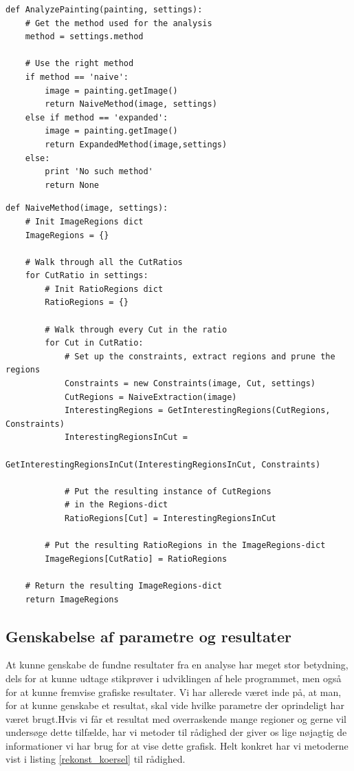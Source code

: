 {\begin{lstlisting}[caption={Pseudokode til analyse af malerier efter
    metode}, captionpos=b, label={pseudo_naiveMethod}, frame=tb,
    breaklines=false, float=h]
def AnalyzePainting(painting, settings):
    # Get the method used for the analysis
    method = settings.method

    # Use the right method
    if method == 'naive':
        image = painting.getImage()
        return NaiveMethod(image, settings)
    else if method == 'expanded':
		image = painting.getImage()
		return ExpandedMethod(image,settings)
	else:
        print 'No such method'
        return None
\end{lstlisting}

\begin{lstlisting}[caption={Pseudokode for den naive metode},
    captionpos=b, label={pseudo_naiveMethod}, frame=tb,
    breaklines=false, float=h]
def NaiveMethod(image, settings):
    # Init ImageRegions dict
    ImageRegions = {}

    # Walk through all the CutRatios
    for CutRatio in settings:
        # Init RatioRegions dict
        RatioRegions = {}

        # Walk through every Cut in the ratio
        for Cut in CutRatio:
            # Set up the constraints, extract regions and prune the regions
            Constraints = new Constraints(image, Cut, settings)
            CutRegions = NaiveExtraction(image)
            InterestingRegions = GetInterestingRegions(CutRegions, Constraints)
            InterestingRegionsInCut =
                    GetInterestingRegionsInCut(InterestingRegionsInCut, Constraints)

            # Put the resulting instance of CutRegions
            # in the Regions-dict
            RatioRegions[Cut] = InterestingRegionsInCut

        # Put the resulting RatioRegions in the ImageRegions-dict
        ImageRegions[CutRatio] = RatioRegions

    # Return the resulting ImageRegions-dict
    return ImageRegions
\end{lstlisting}

\subsection{Genskabelse af parametre og resultater}
At kunne genskabe de fundne resultater fra en analyse har meget stor
betydning, dels for at kunne udtage stikprøver i udviklingen af hele
programmet, men også for at kunne fremvise grafiske resultater. Vi har
allerede været inde på, at man, for at kunne genskabe et resultat, skal
vide hvilke parametre der oprindeligt har været brugt.Hvis vi får et
resultat med overraskende mange regioner og gerne vil undersøge dette
tilfælde, har vi metoder til rådighed der giver os lige nøjagtig de
informationer vi har brug for at vise dette grafisk. Helt konkret har vi
metoderne vist i listing \ref{rekonst_koersel} til rådighed.

}

